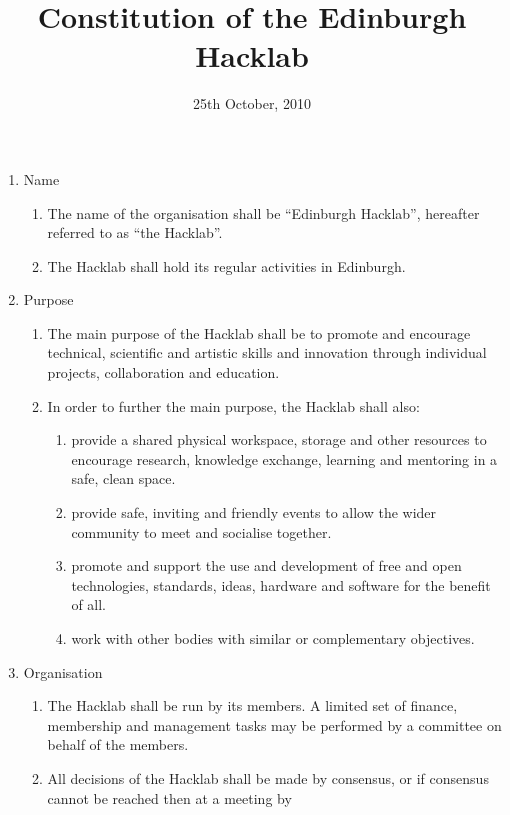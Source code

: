 \documentclass{article}
\title{Constitution of the Edinburgh Hacklab}
\date{25th October, 2010}
\begin{document}
\maketitle
\begin{enumerate}
  \item Name
    \begin{enumerate}
      \item The name of the organisation shall be ``Edinburgh
        Hacklab'', hereafter referred to as ``the Hacklab''.
      \item The Hacklab shall hold its regular activities in Edinburgh.
    \end{enumerate} %
  \item Purpose
    \begin{enumerate}
      \item The main purpose of the Hacklab shall be to promote and
        encourage technical, scientific and artistic skills and
        innovation through individual projects, collaboration and
        education.
      \item In order to further the main purpose, the Hacklab shall also:
        \begin{enumerate}
          \item provide a shared physical workspace, storage and other
            resources to encourage research, knowledge exchange,
            learning and mentoring in a safe, clean space.
          \item provide safe, inviting and friendly events to allow
            the wider community to meet and socialise together.
          \item promote and support the use and development of free
            and open technologies, standards, ideas, hardware and
            software for the benefit of all.
          \item work with other bodies with similar or complementary
            objectives.
        \end{enumerate}
    \end{enumerate} %
  \item Organisation
    \begin{enumerate}
    \item The Hacklab shall be run by its members. A limited set of
      finance, membership and management tasks may be performed by a
      committee on behalf of the members.
    \item All decisions of the Hacklab shall be made by consensus,
      or if consensus cannot be reached then at a meeting by

\end{enumerate}
\end{enumerate}
\end{document}
